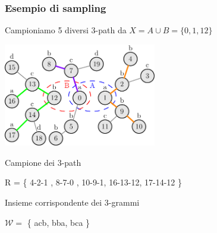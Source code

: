 
\begin{frame}
	\frametitle{Esempio di sampling}
	\centering
	
	Campioniamo 5 diversi $3$-path da $X = A \cup B = \{ 0, 1, 12 \}$
	
	\includegraphics[width=0.5\textwidth]{images/13_sampl}
	
	\medskip
	
	Campione dei $3$-path 
	
	R = \{ \color{orange} 4-2-1 \color{black}, \color{RoyalPurple} 8-7-0 \color{black}, \color{orange} 10-9-1\color{black}, \color{green} 16-13-12\color{black},  \color{green} 17-14-12 \color{black}\}
	
	Insieme corrispondente dei $3$-grammi 
	
	$\mathcal{W} = $ \{ \color{green} acb\color{black}, \color{orange}bba\color{black}, \color{RoyalPurple} bca \color{black} \}
	
	
\end{frame}

